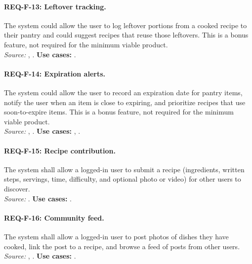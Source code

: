 \paragraph{REQ-F-13: Leftover tracking.}
 The system could allow the user to log leftover portions from a cooked recipe to their pantry and could suggest recipes that reuse those leftovers. This is a bonus feature, not required for the minimum viable product.\\
\textit{Source:} , . \textbf{Use cases:} .

\paragraph{REQ-F-14: Expiration alerts.}
 The system could allow the user to record an expiration date for pantry items, notify the user when an item is close to expiring, and prioritize recipes that use soon-to-expire items. This is a bonus feature, not required for the minimum viable product.\\
\textit{Source:} , . \textbf{Use cases:} , .

\paragraph{REQ-F-15: Recipe contribution.}
 The system shall allow a logged-in user to submit a recipe (ingredients, written steps, servings, time, difficulty, and optional photo or video) for other users to discover.\\
\textit{Source:} . \textbf{Use cases:} .

\paragraph{REQ-F-16: Community feed.}
 The system shall allow a logged-in user to post photos of dishes they have cooked, link the post to a recipe, and browse a feed of posts from other users.\\
\textit{Source:} , . \textbf{Use cases:} .

